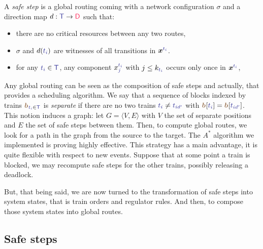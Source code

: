 \documentclass[runningheads]{llncs}
\newcommand{\directions}{\dirFmt{\mathsf{D}}}
\newcommand{\dirFmt}[1]{{\color{dircolor} #1}}
\newcommand{\posFmt}[1]{{\color{poscolor}{#1}}}
\newcommand{\bid}[1]{\ensuremath{\posFmt{b_{#1}}}}
\newcommand{\trainFmt}[1]{{\color{traincolor} #1}}
\newcommand{\trains}{{\trainFmt{\mathsf{T}}}}
\newcommand{\tid}[1]{\ensuremath{\trainFmt{t_{#1}}}}
\begin{document}
A \emph{safe step} is a global routing  coming with a network configuration $\sigma$ and a direction map $d: \trains \to \directions$ such that:
\begin{itemize}
\item there are no critical resources between any two routes,
\item $\sigma$ and $d(\tid{i})$ are witnesses of all transitions in $\vec{x}^\tid{i}$. 
\item for any $\tid{i} \in \trains$, any component $x_j^\tid{i}$ with $j \leq k_{\tid{i}}$ occurs only once in $\vec{x}^{\tid{i}}$,
\end{itemize}

Any global routing can be seen as the composition of safe steps and actually, that provides a scheduling algorithm. We say that a sequence of blocks indexed by trains $\vec{\bid{}}_{\tid{i} \in \trains}$ is \emph{separate} if there are no two trains $\tid{i} \neq \tid{id'}$ with $\vec{\bid{}}[\tid{i}] = \vec{\bid{}}[\tid{id'}]$. This notion induces a graph: let $G = \langle V, E\rangle$ with $V$ the set of separate positions and $E$ the set of safe steps between them.  Then, to compute global routes, we look for a path in the graph from the source to the target. The  $A^*$ algorithm we implemented is proving highly effective. This strategy has a main advantage, it is quite flexible with respect to new events. Suppose that at some point a train is blocked, we may recompute safe steps for the other trains, possibly releasing a deadlock. 

 But, that being said, we are now turned to the transformation of safe steps into system states, that is train orders and regulator rules. And then, to compose those system states into global routes. 

\subsection{Safe steps}
\label{sec:experiments:4}
\end{document}
